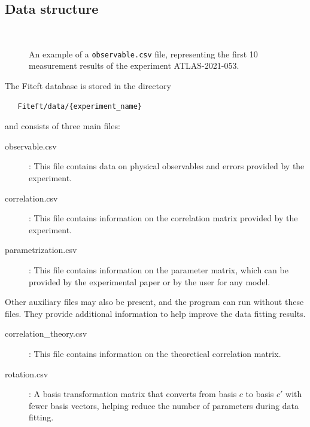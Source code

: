 \documentclass[12pt]{article}
\newlength{\mywidth}\setlength{\mywidth}{14.5cm}
\begin{document}
 \subsection{Data structure}
 \begin{figure}
   \resizebox{\textwidth}{!}{
     
     }\\
     \caption{An example of a \texttt{observable.csv} file, representing the first 10 measurement results of the experiment ATLAS-2021-053\cite{ATLAS:2021vrm}.}
 \end{figure}
 
 The Fiteft database is stored in the directory
 \begin{verbatim}
   Fiteft/data/{experiment_name}
 \end{verbatim}
 and consists of three main files:
 \begin{description}
   \item[observable.csv]: This file contains data on physical observables and errors provided by the experiment.
   \item[correlation.csv]: This file contains information on the correlation matrix provided by the experiment.
   \item[parametrization.csv]: This file contains information on the parameter matrix, which can be provided by the experimental paper or by the user for any model.
 \end{description}
 Other auxiliary files may also be present, and the program can run without these files. They provide additional information to help improve the data fitting results.
 \begin{description} 
   \item [correlation\_theory.csv]: This file contains information on the theoretical correlation matrix.
   \item [rotation.csv]: A basis transformation matrix that converts from basis $c$ to basis $c'$ with fewer basis vectors, helping reduce the number of parameters during data fitting.
 \end{description}
\end{document}
